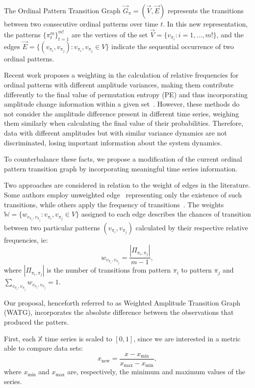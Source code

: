 \documentclass{isprs}
\begin{document}
The Ordinal Pattern Transition Graph $\vec{G}_{\pi} = (\vec{V}, \vec{E})$ represents the transitions between two consecutive ordinal patterns over time $t$.
In this new representation, the patterns $\{\pi_t^m \}_{t = 1}^{m!}$ are the vertices of the set $\vec{V} = \{v_{\pi_i}: i = 1, \dots, m! \}$, and the edges $\vec{E} = \{(v_{\pi_i}, v_{\pi_j}): v_{\pi_i}, v_{\pi_j} \in V \}$ indicate the sequential occurrence of two ordinal patterns.

Recent work proposes a weighting in the calculation of relative frequencies for ordinal patterns with different amplitude variances, making them contribute differently to the final value of permutation entropy (PE) and thus incorporating amplitude change information within a given set~\citep{Fadlallah2013Weightedpermutation}.
However, these methods do not consider the amplitude difference present in different time series, weighing them similarly when calculating the final value of their probabilities.
Therefore, data with different amplitudes but with similar variance dynamics are not discriminated, losing important information about the system dynamics.

To counterbalance these facts, we propose a modification of the current ordinal pattern transition graph by incorporating meaningful time series information.

Two approaches are considered in relation to the weight of edges in the literature.
Some authors employ unweighted edge~\citep{McCullough2015lagged, Kulp2016ordinal} representing only the existence of such transitions, while others apply the frequency of transitions~\citep{Sorrentino2015periodic, Zhang2017ConstructingOP}.
The weights $\mathbb{W} = \{w_{v_{\pi_i}, v_{\pi_j}}: v_{\pi_i}, v_{\pi_j} \in V \}$ assigned to each edge describes the chances of transition between two particular patterns $(v_{\pi_i}, v_{\pi_j})$ calculated by their respective relative frequencies, ie:	
\begin{equation}
w_{v_{\pi_i}, v_{\pi_j}} = \frac{|\Pi_{\pi_i,\pi_j}|}{m-1},
\end{equation}
where $|\Pi_{\pi_i,\pi_j}|$ is the number of transitions from pattern $\pi_i$ to pattern $\pi_j$ and $\sum_{v_{\pi_i}, v_{\pi_j}}w_{v_{\pi_i}, v_{\pi_j}} = 1$.

Our proposal, henceforth referred to as Weighted Amplitude Transition Graph (WATG), incorporates the absolute difference between the observations that produced the patters.

First, each $\mathbb{X}$ time series is scaled to $[0, 1]$, since we are interested in a metric able to compare data sets:
\begin{equation}
x_{\text{new}} = \frac{x - x_{\min}}{x_{\max} - x_{\min}},
\end{equation}
where $x_{\min}$ and $x_{\max}$ are, respectively, the minimum and maximum values of the series.
\end{document}
